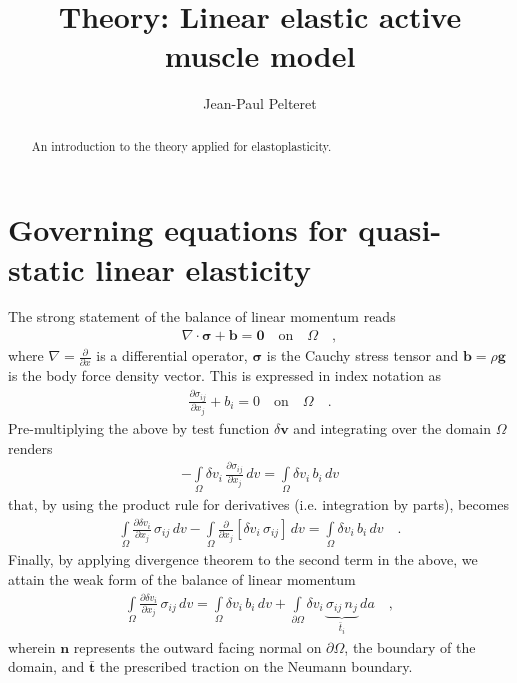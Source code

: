 \documentclass[]{scrartcl}
\title{Theory: Linear elastic active muscle model}
\author{Jean-Paul Pelteret}
\begin{document}
\maketitle

\begin{abstract}
An introduction to the theory applied for elastoplasticity.
\end{abstract}

\section{Governing equations for quasi-static linear elasticity}
The strong statement of the balance of linear momentum reads
\begin{gather}
\nabla \cdot \boldsymbol{\sigma} + \mathbf{b} 
  = \mathbf{0}
\quad \text{on} \quad \Omega \quad ,
\end{gather}
where $\nabla = \frac{\partial}{\partial x}$ is a differential operator,
$\boldsymbol{\sigma}$ is the Cauchy stress tensor and
$\mathbf{b} = \rho \mathbf{g}$ is the body force density vector.
This is expressed in index notation as
\begin{gather}
\frac{\partial \sigma_{ij}}{\partial x_{j}} + b_{i} 
  = 0
\quad \text{on} \quad \Omega \quad .
\end{gather}
Pre-multiplying the above by test function $\delta \mathbf{v}$ and integrating over the domain $\Omega$ renders
\begin{gather}
- \int\limits_{\Omega} \delta v_{i} \,  \frac{\partial \sigma_{ij}}{\partial x_{j}} \, dv
  = \int\limits_{\Omega} \delta v_{i} \, b_{i} \, dv
\end{gather}
that, by using the product rule for derivatives (i.e. integration by parts), becomes
\begin{gather}
\int\limits_{\Omega} \frac{\partial \delta v_{i}}{\partial x_{j}} \, \sigma_{ij} \, dv
- \int\limits_{\Omega} \frac{\partial}{\partial x_{j}} \left[ \delta v_{i} \, \sigma_{ij} \right] \, dv
  = \int\limits_{\Omega} \delta v_{i} \, b_{i} \, dv
\quad .
\end{gather}
Finally, by applying divergence theorem to the second term in the above, we attain the weak form of the balance of linear momentum
\begin{gather}
\int\limits_{\Omega} \frac{\partial \delta v_{i}}{\partial x_{j}} \, \sigma_{ij} \, dv
  = \int\limits_{\Omega} \delta v_{i} \, b_{i} \, dv
  + \int\limits_{\partial\Omega} \delta v_{i} \, \underbrace{\sigma_{ij} \, n_{j}}_{\bar{t}_{i}} \, da
\quad ,
\label{equ: Weak form of the balance of linear momentum}
\end{gather}
wherein $\mathbf{n}$ represents the outward facing normal on $\partial\Omega$, the boundary of the domain, and $\bar{\mathbf{t}}$ the prescribed traction on the Neumann boundary.
\end{document}
